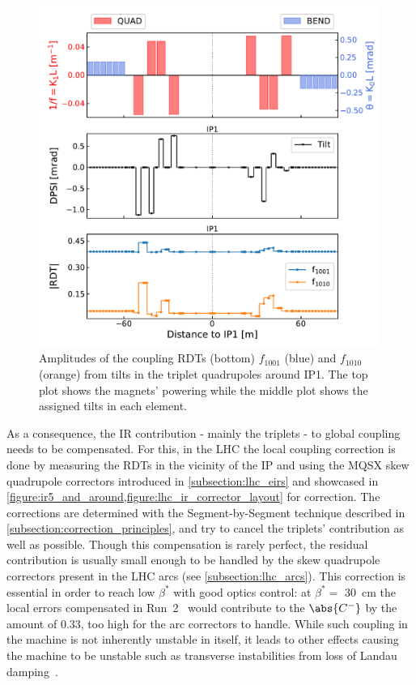 \begin{figure}[!htb]
    \centering
    \includegraphics*[width=0.99\textwidth]{Figures/IR_Coupling_Correction/triplet_tilts_to_rdts.pdf}
    \caption{Amplitudes of the coupling RDTs (bottom) \(f_{1001}\) (\textcolor{mplblue}{blue}) and \(f_{1010}\) (\textcolor{mplorange}{orange}) from tilts in the triplet quadrupoles around IP\num{1}. The top plot shows the magnets' powering while the middle plot shows the assigned tilts in each element.}
    \label{figure:triplet_tilts_to_rdts}
\end{figure}

As a consequence, the IR contribution - mainly the triplets - to global coupling needs to be compensated.
For this, in the LHC the local coupling correction is done by measuring the RDTs in the vicinity of the IP and using the MQSX skew quadrupole correctors introduced in \cref{subsection:lhc_eirs} and showcased in \cref{figure:ir5_and_around,figure:lhc_ir_corrector_layout} for correction.
The corrections are determined with the Segment-by-Segment technique described in \cref{subsection:correction_principles}, and try to cancel the triplets' contribution as well as possible.
Though this compensation is rarely perfect, the residual contribution is usually small enough to be handled by the skew quadrupole correctors present in the LHC arcs (see \cref{subsection:lhc_arcs}).
This correction is essential in order to reach low \(\beta^{\ast}\) with good optics control: at \(\beta^{*}=\) \qty{30}{\centi\meter} the local errors compensated in Run~\num{2}~\cite{CERN:Persson:LHCOpticsCorrectionsEvian2019} would contribute to the \(\abs{C^{-}}\) by the amount of \num{0.33}, too high for the arc correctors to handle.
While such coupling in the machine is not inherently unstable in itself, it leads to other effects causing the machine to be unstable such as transverse instabilities from loss of Landau damping~\cite{MASTERS:Soubelet:Optics_Octupole_PyHEADTAIL,PRAB:Carver:Transverse_Instabilities_With_Coupling}.

